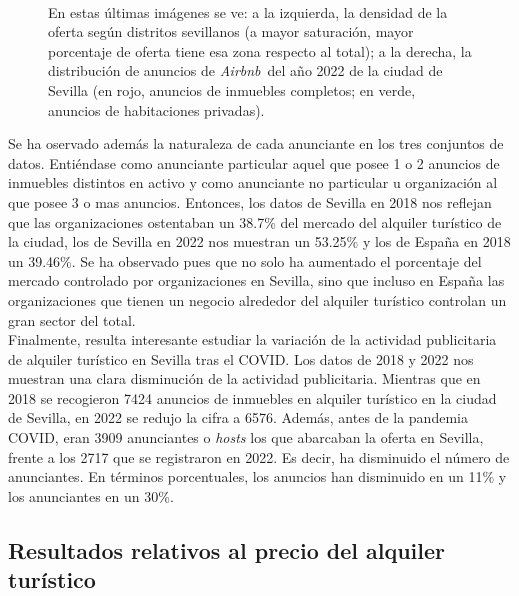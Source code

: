 \documentclass[a4paper,10pt]{article}
\newcommand*{\airbnb}{\textit{Airbnb}}
\begin{document}
\begin{figure}[ht]
                \hfill \\
                En estas últimas imágenes se ve: a la izquierda, la densidad de la oferta según distritos sevillanos (a mayor saturación, mayor
                porcentaje de oferta tiene esa zona respecto al total); a la derecha, la distribución de anuncios de \airbnb \ del año 2022
                de la ciudad de Sevilla (en rojo, anuncios de inmuebles completos; en verde, anuncios de habitaciones privadas).

            \end{figure}

            Se ha oservado además la naturaleza de cada anunciante en los tres conjuntos de datos. Entiéndase como anunciante particular 
            aquel que posee 1 o 2 anuncios de inmuebles distintos en activo y como anunciante no particular u organización al que posee 3 o mas 
            anuncios. Entonces, los datos de Sevilla en 2018 nos reflejan que las organizaciones ostentaban un 38.7\% del mercado del alquiler turístico de 
            la ciudad, los de Sevilla en 2022 nos muestran un 53.25\% y los de España en 2018 un 39.46\%. Se ha observado pues que no solo ha aumentado
            el porcentaje del mercado controlado por organizaciones en Sevilla, sino que incluso en España las organizaciones que tienen un negocio
            alrededor del alquiler turístico controlan un gran sector del total. \\ 

            Finalmente, resulta interesante estudiar la variación de la actividad publicitaria de alquiler turístico en Sevilla tras el COVID.
            Los datos de 2018 y 2022 nos muestran una clara disminución de la actividad publicitaria. Mientras que en 2018 se recogieron 
            7424 anuncios de inmuebles en alquiler turístico en la ciudad de Sevilla, en 2022 se redujo la cifra a 6576. Además, 
            antes de la pandemia COVID, eran 3909 anunciantes o \textit{hosts} los que abarcaban la oferta en Sevilla, frente a los 2717 que
            se registraron en 2022. Es decir, ha disminuido el número de anunciantes. En términos porcentuales, los anuncios han disminuido 
            en un 11\% y los anunciantes en un 30\%.

        \clearpage

        \subsection{Resultados relativos al precio del alquiler turístico}
            
\end{document}
